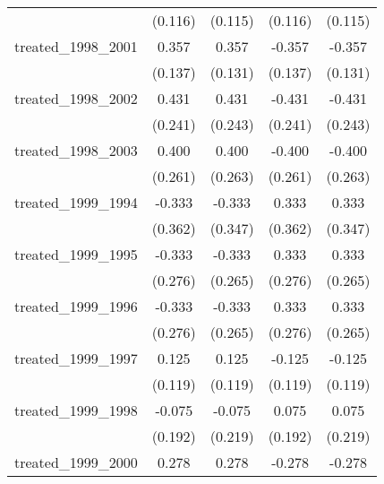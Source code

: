 {\begin{tabular}{l*{4}{c}}
            &     (0.116)         &     (0.115)         &     (0.116)         &     (0.115)         \\
[1em]
treated\_1998\_2001&       0.357\sym{**} &       0.357\sym{**} &      -0.357\sym{**} &      -0.357\sym{**} \\
            &     (0.137)         &     (0.131)         &     (0.137)         &     (0.131)         \\
[1em]
treated\_1998\_2002&       0.431         &       0.431         &      -0.431         &      -0.431         \\
            &     (0.241)         &     (0.243)         &     (0.241)         &     (0.243)         \\
[1em]
treated\_1998\_2003&       0.400         &       0.400         &      -0.400         &      -0.400         \\
            &     (0.261)         &     (0.263)         &     (0.261)         &     (0.263)         \\
[1em]
treated\_1999\_1994&      -0.333         &      -0.333         &       0.333         &       0.333         \\
            &     (0.362)         &     (0.347)         &     (0.362)         &     (0.347)         \\
[1em]
treated\_1999\_1995&      -0.333         &      -0.333         &       0.333         &       0.333         \\
            &     (0.276)         &     (0.265)         &     (0.276)         &     (0.265)         \\
[1em]
treated\_1999\_1996&      -0.333         &      -0.333         &       0.333         &       0.333         \\
            &     (0.276)         &     (0.265)         &     (0.276)         &     (0.265)         \\
[1em]
treated\_1999\_1997&       0.125         &       0.125         &      -0.125         &      -0.125         \\
            &     (0.119)         &     (0.119)         &     (0.119)         &     (0.119)         \\
[1em]
treated\_1999\_1998&      -0.075         &      -0.075         &       0.075         &       0.075         \\
            &     (0.192)         &     (0.219)         &     (0.192)         &     (0.219)         \\
[1em]
treated\_1999\_2000&       0.278         &       0.278         &      -0.278         &      -0.278         \\

\end{tabular}}
